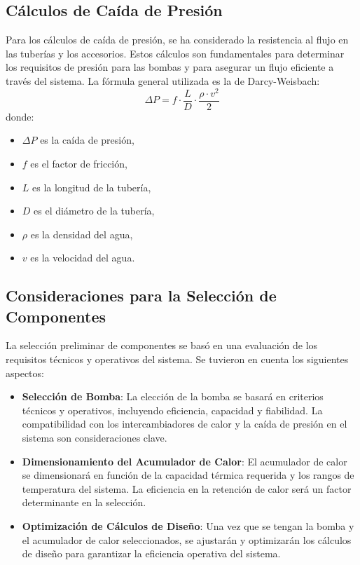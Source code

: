 \documentclass[11pt,a4paper]{article}  %
\begin{document}
\subsection{Cálculos de Caída de Presión}
Para los cálculos de caída de presión, se ha considerado la resistencia al flujo en las tuberías y los accesorios. Estos cálculos son fundamentales para determinar los requisitos de presión para las bombas y para asegurar un flujo eficiente a través del sistema. La fórmula general utilizada es la de Darcy-Weisbach:
\[ \Delta P = f \cdot \frac{L}{D} \cdot \frac{\rho \cdot v^2}{2} \]
donde:
\begin{itemize}
    \item \( \Delta P \) es la caída de presión,
    \item \( f \) es el factor de fricción,
    \item \( L \) es la longitud de la tubería,
    \item \( D \) es el diámetro de la tubería,
    \item \( \rho \) es la densidad del agua,
    \item \( v \) es la velocidad del agua.
\end{itemize}

\subsection{Consideraciones para la Selección de Componentes}
La selección preliminar de componentes se basó en una evaluación de los requisitos técnicos y operativos del sistema. Se tuvieron en cuenta los siguientes aspectos:
\begin{itemize}
    \item \textbf{Selección de Bomba}: La elección de la bomba se basará en criterios técnicos y operativos, incluyendo eficiencia, capacidad y fiabilidad. La compatibilidad con los intercambiadores de calor y la caída de presión en el sistema son consideraciones clave.
    
    \item \textbf{Dimensionamiento del Acumulador de Calor}: El acumulador de calor se dimensionará en función de la capacidad térmica requerida y los rangos de temperatura del sistema. La eficiencia en la retención de calor será un factor determinante en la selección.
    
    \item \textbf{Optimización de Cálculos de Diseño}: Una vez que se tengan la bomba y el acumulador de calor seleccionados, se ajustarán y optimizarán los cálculos de diseño para garantizar la eficiencia operativa del sistema.
\end{itemize}
\end{document}
